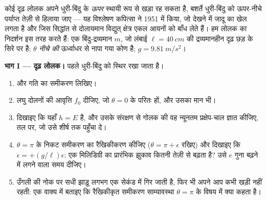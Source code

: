\begin{problem}\label{pb:b3:lagrangian-mechanics:1}
कोई दृढ़ लोलक अपने धुरी-बिंदु के \emph{ऊपर} स्थायी रूप से खड़ा रह सकता
है, बशर्ते धुरी-बिंदु को ऊपर-नीचे पर्याप्त तेज़ी से हिलाया जाए --- यह
विश्लेषण कपित्सा ने 1951 में किया, जो देखने में जादू का खेल लगता है और
जिस सिद्धांत से दोलायमान विद्युत् क्षेत्र एकल आयनों को बाँध लेते हैं।
हम लोलक का निदर्शन इस तरह करते हैं: एक बिंदु-द्रव्यमान $m$, जो लंबाई
$\ell = \qty{40}{cm}$ की द्रव्यमानहीन दृढ़ छड़ के सिरे पर है; $\theta$
\emph{नीचे की} ऊर्ध्वाधर से नापा गया कोण है; $g = \qty{9.81}{m/s^2}$।

\medskip\noindent\textbf{भाग I --- दृढ़ लोलक।}
पहले धुरी-बिंदु को स्थिर रखा जाता है।
\begin{enumerate}
  \item {} और गति का समीकरण लिखिए।
  \item लघु दोलनों की आवृत्ति $f_0$ दीजिए, जो $\theta =
        0$ के परितः हों, और उसका मान भी।
  \item दिखाइए कि यहाँ $h = E$ है, और उसके संरक्षण से गोलक की वह
        न्यूनतम प्रक्षेप-चाल ज्ञात कीजिए, तल पर, जो उसे शीर्ष तक
        पहुँचा दे।
  \item $\theta = \pi$ के निकट समीकरण का रैखिकीकरण कीजिए ($\theta = \pi +
        \epsilon$ रखिए) और दिखाइए कि $\ddot\epsilon = +(g/\ell)\epsilon$:
        एक मिलिडिग्री का प्रारंभिक झुकाव कितनी तेज़ी से बढ़ता है? उसे
        $e$ गुना बढ़ने में लगने वाला समय दीजिए।
  \item उँगली की नोक पर सधी झाड़ू लगभग एक सेकंड में गिर जाती है, फिर भी
        अपने आप कभी खड़ी नहीं रहती: एक वाक्य में बताइए कि रैखिकीकृत
        समीकरण साम्यावस्था $\theta = \pi$ के विषय में क्या कहता है।
\end{enumerate}


\end{problem}
